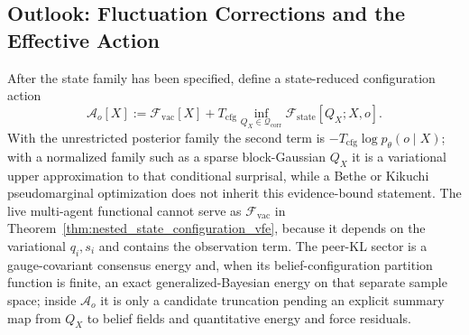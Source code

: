 \subsection{Outlook: Fluctuation Corrections and the Effective Action}

After the state family has been specified, define a state-reduced configuration action
\begin{equation}
\mathcal{A}_o[X]
:=\mathcal{F}_{\mathrm{vac}}[X]
+T_{\mathrm{cfg}}
\inf_{Q_X\in\mathcal{Q}_{\mathrm{corr}}}
\mathcal{F}_{\mathrm{state}}[Q_X;X,o].
\label{eq:beyond_mf_bare_action}
\end{equation}
With the unrestricted posterior family the second term is $-T_{\mathrm{cfg}}\log p_\theta(o\mid X)$; with a normalized family such as a sparse block-Gaussian $Q_X$ it is a variational upper approximation to that conditional surprisal, while a Bethe or Kikuchi pseudomarginal optimization does not inherit this evidence-bound statement. The live multi-agent functional cannot serve as $\mathcal{F}_{\mathrm{vac}}$ in Theorem~\ref{thm:nested_state_configuration_vfe}, because it depends on the variational $q_i,s_i$ and contains the observation term. The peer-KL sector is a gauge-covariant consensus energy and, when its belief-configuration partition function is finite, an exact generalized-Bayesian energy on that separate sample space; inside $\mathcal{A}_o$ it is only a candidate truncation pending an explicit summary map from $Q_X$ to belief fields and quantitative energy and force residuals.

